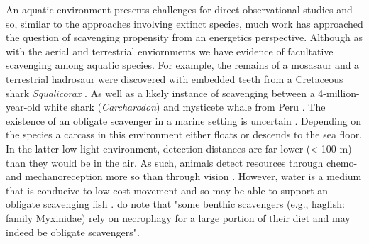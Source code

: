 \documentclass[a4paper,12pt]{article}
\begin{document}
An aquatic environment presents challenges for direct observational studies and so, similar to the approaches involving extinct species, much work has approached the question of scavenging propensity from an energetics perspective. Although as with the aerial and terrestrial enviornments we have evidence of facultative scavenging among aquatic species. For example, the remains of a mosasaur and a terrestrial hadrosaur were discovered with embedded teeth from a Cretaceous shark \textit{Squalicorax} \citep{schwimmer1997scavenging}. As well as a likely instance of scavenging between a 4-million-year-old white shark (\textit{Carcharodon}) and mysticete whale from Peru \citep{ehret2009caught}.
The existence of an obligate scavenger in a marine setting is uncertain \citep{britton1994marine,smith2003ecology,ruxton2004energetic,ruxton2005searching}. Depending on the species a carcass in this environment either floats or descends to the sea floor. In the latter low-light environment, detection distances are far lower (< 100 m) than they would be in the air. As such, animals detect resources through chemo- and mechanoreception more so than through vision \citep{ruxton2004energetic}. However, water is a medium that is conducive to low-cost movement \citep{tucker1975energetic} and so may be able to support an obligate scavenging fish \citep{ruxton2004energetic,ruxton2005searching}. \cite{benbow2015introduction} do note that "some benthic scavengers (e.g., hagfish: family Myxinidae) rely on necrophagy for a large portion of their diet and may indeed be obligate scavengers". 

\end{document}
